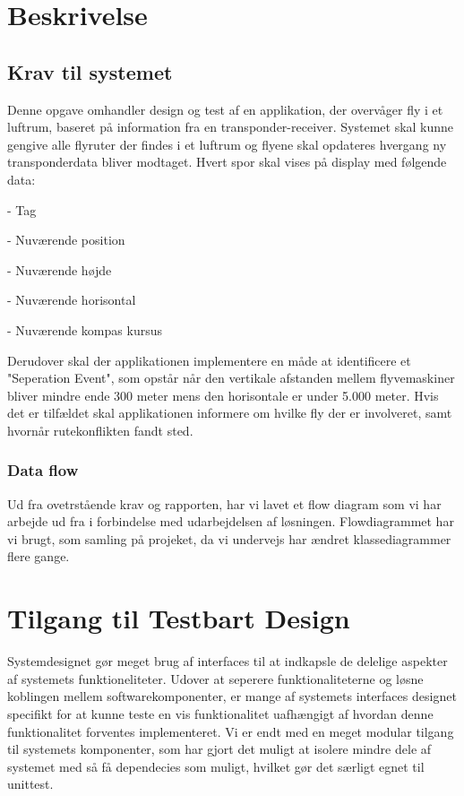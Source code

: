 \section{Beskrivelse}
\subsection{Krav til systemet}
Denne opgave omhandler design og test af en applikation, der overvåger fly i et luftrum, baseret på information fra en transponder-receiver. 
Systemet skal kunne gengive alle flyruter der findes i et luftrum og flyene skal opdateres hvergang ny transponderdata bliver modtaget. Hvert spor skal vises på display med følgende data: 

- Tag

- Nuværende position

- Nuværende højde

- Nuværende horisontal

- Nuværende kompas kursus

Derudover skal der applikationen implementere en måde at identificere et "Seperation Event", som opstår når den vertikale afstanden mellem flyvemaskiner bliver mindre ende 300 meter mens den horisontale er under 5.000 meter. 
Hvis det er tilfældet skal applikationen informere om hvilke fly der er involveret, samt hvornår rutekonflikten fandt sted.

\subsubsection{Data flow}
Ud fra ovetrstående krav og rapporten, har vi lavet et flow diagram som vi har arbejde ud fra i forbindelse med udarbejdelsen af løsningen. Flowdiagrammet har vi brugt, som samling på projeket, da vi undervejs har ændret klassediagrammer flere gange. 




\newpage
\section{Tilgang til Testbart Design}

Systemdesignet gør meget brug af interfaces til at indkapsle de delelige aspekter af systemets funktioneliteter. 
Udover at seperere funktionaliteterne og løsne koblingen mellem softwarekomponenter, er mange af systemets interfaces designet specifikt for at kunne teste en vis funktionalitet uafhængigt af hvordan denne funktionalitet forventes implementeret.
Vi er endt med en meget modular tilgang til systemets komponenter, som har gjort det muligt at isolere mindre dele af systemet med så få dependecies som muligt, hvilket gør det særligt egnet til unittest.

